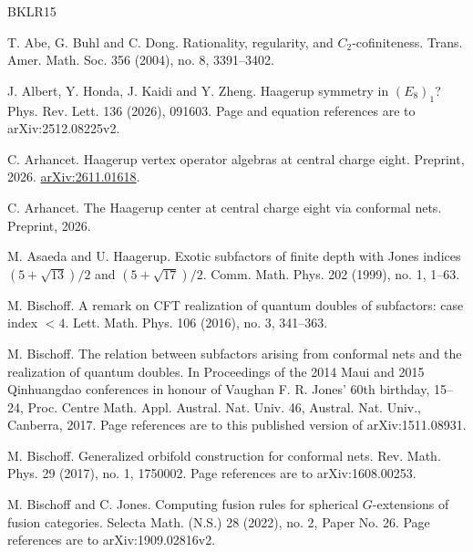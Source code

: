 \documentclass[leqno]{article}
\numberwithin{equation}{section}
\begin{document}
\small
\begin{thebibliography}{BKLR15}
\raggedright

T. Abe, G. Buhl and C. Dong.
\newblock Rationality, regularity, and $C_2$-cofiniteness.
\newblock Trans. Amer. Math. Soc. 356 (2004), no. 8, 3391--3402.

J. Albert, Y. Honda, J. Kaidi and Y. Zheng.
\newblock Haagerup symmetry in $(E_8)_1$?
\newblock Phys. Rev. Lett. 136 (2026), 091603. Page and equation references are to arXiv:2512.08225v2.

C. Arhancet.
\newblock Haagerup vertex operator algebras at central charge eight.
\newblock Preprint, 2026. \href{https://arxiv.org/abs/2611.01618}{arXiv:2611.01618}.

C. Arhancet.
\newblock The Haagerup center at central charge eight via conformal nets.
\newblock Preprint, 2026.

M. Asaeda and U. Haagerup.
\newblock Exotic subfactors of finite depth with Jones indices $(5+\sqrt{13})/2$ and $(5+\sqrt{17})/2$.
\newblock Comm. Math. Phys. 202 (1999), no. 1, 1--63.

M. Bischoff.
\newblock A remark on CFT realization of quantum doubles of subfactors: case index $< 4$.
\newblock Lett. Math. Phys. 106 (2016), no. 3, 341--363.

M. Bischoff.
\newblock The relation between subfactors arising from conformal nets and the realization of quantum doubles.
\newblock In Proceedings of the 2014 Maui and 2015 Qinhuangdao conferences in honour of Vaughan F. R. Jones' 60th birthday, 15--24, Proc. Centre Math. Appl. Austral. Nat. Univ. 46, Austral. Nat. Univ., Canberra, 2017. Page references are to this published version of arXiv:1511.08931.

M. Bischoff.
\newblock Generalized orbifold construction for conformal nets.
\newblock Rev. Math. Phys. 29 (2017), no. 1, 1750002. Page references are to arXiv:1608.00253.

M. Bischoff and C. Jones.
\newblock Computing fusion rules for spherical $G$-extensions of fusion categories.
\newblock Selecta Math. (N.S.) 28 (2022), no. 2, Paper No. 26. Page references are to arXiv:1909.02816v2.


\end{thebibliography}
\end{document}
